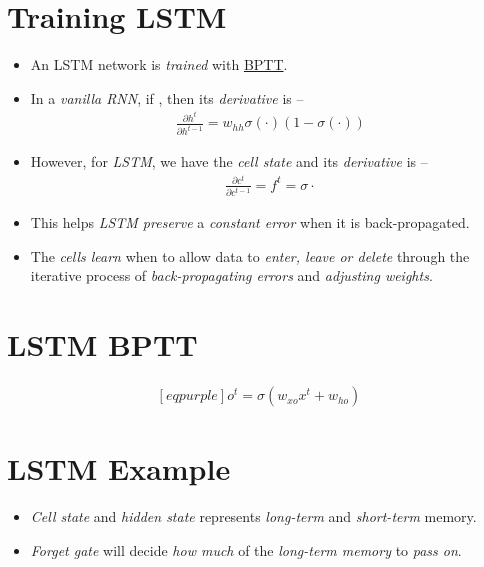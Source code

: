 \documentclass[
	number={10},
	title={Recurrent Neural Networks}
]{cs584notes}
\begin{document}
\section{Training LSTM}\label{sec:training-lstm}
\begin{itemize}
	\item An LSTM network is \emph{trained} with \hyperref[sec:backpropagation-through-time]{BPTT}.
	\item In a \emph{vanilla RNN}, if , then its \emph{derivative} is --
	\begin{equation*}
	\begin{aligned}
		\frac{\partial h^{t}}{\partial h^{t-1}} = w_{hh}\sigma(\cdot) \left( 1 - \sigma(\cdot) \right)
	\end{aligned}
	\end{equation*}
	\item However, for \emph{LSTM}, we have the \emph{cell state}  and its \emph{derivative} is --
	\begin{equation*}
	\begin{aligned}
		\frac{\partial c^{t}}{\partial c^{t-1}} = f^{t} = \sigma{\cdot}
	\end{aligned}
	\end{equation*}
	\item This helps \emph{LSTM preserve} a \emph{constant error} when it is back-propagated.
	\item The \emph{cells learn} when to allow data to \emph{enter, leave or delete} through the iterative process of \emph{back-propagating errors} and \emph{adjusting weights}.
\end{itemize}

\section{LSTM BPTT}\label{sec:lstm-bptt}
\begin{equation*}
\begin{aligned}[eqpurple]
	o^{t} = \sigma \left( w_{xo}x^{t} + w_{ho} \right)
\end{aligned}
\end{equation*}

\section{LSTM Example}\label{sec:lstm-example}
\begin{itemize}
	\item \emph{Cell state} and \emph{hidden state} represents \emph{long-term} and \emph{short-term} memory.
	\item \emph{Forget gate} will decide \emph{how much} of the \emph{long-term memory} to \emph{pass on}.
\end{itemize}
\end{document}

